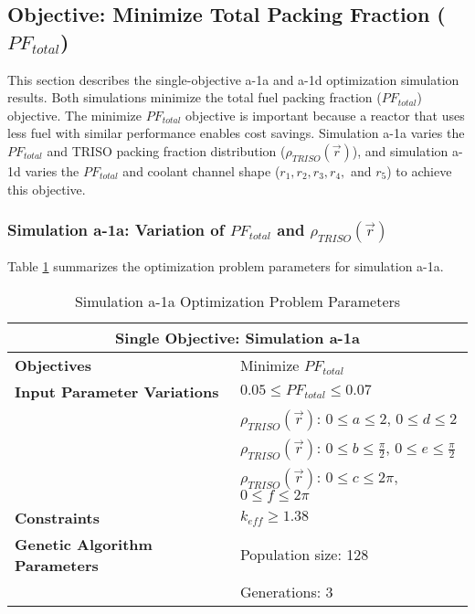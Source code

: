 \subsection{Objective: Minimize Total Packing Fraction ($PF_{total}$)}
\label{sec:assem-1-obj-pf}
This section describes the single-objective a-1a and a-1d optimization simulation
results. 
Both simulations minimize the total fuel packing fraction ($PF_{total}$) objective. 
The minimize $PF_{total}$ objective is important because a reactor that uses less fuel
with similar performance enables cost savings. 
Simulation a-1a varies the $PF_{total}$ and \gls{TRISO} packing fraction distribution 
($\rho_{TRISO}(\vec{r})$), and simulation a-1d varies the $PF_{total}$ and coolant 
channel shape ($r_1, r_2, r_3, r_4,$ and $r_5$) to achieve this objective. 

\subsubsection{Simulation a-1a: Variation of $PF_{total}$ and $\rho_{TRISO}(\vec{r})$}
Table \ref{tab:simulationa1a}  summarizes the optimization problem parameters for 
simulation a-1a.
\begin{table}[htbp!]
    \centering
    \onehalfspacing
    \caption{Simulation a-1a Optimization Problem Parameters}
	\label{tab:simulationa1a}
    \footnotesize
    \begin{tabular}{l|p{5.3cm}}
    \hline 
    \multicolumn{2}{c}{\textbf{Single Objective: Simulation a-1a}} \\
    \hline 
    \textbf{Objectives} & Minimize $PF_{total}$ \\
    \hline 
    \textbf{Input Parameter Variations} & $0.05 \leq PF_{total} \leq 0.07$ \\
    & $\rho_{TRISO}(\vec{r})$: $0 \leq a \leq 2$, $0 \leq d \leq 2$\\
    & $\rho_{TRISO}(\vec{r})$: $0 \leq b \leq \frac{\pi}{2}$, $0 \leq e \leq \frac{\pi}{2}$\\
    & $\rho_{TRISO}(\vec{r})$: $0 \leq c \leq 2\pi$, $0 \leq f \leq 2\pi$\\
    \hline
    \textbf{Constraints} & $k_{eff} \geq 1.38$\\ 
    \hline 
    \textbf{Genetic Algorithm Parameters} & Population size: 128 \\
    & Generations: 3 \\
    \hline
    \end{tabular}
\end{table}
